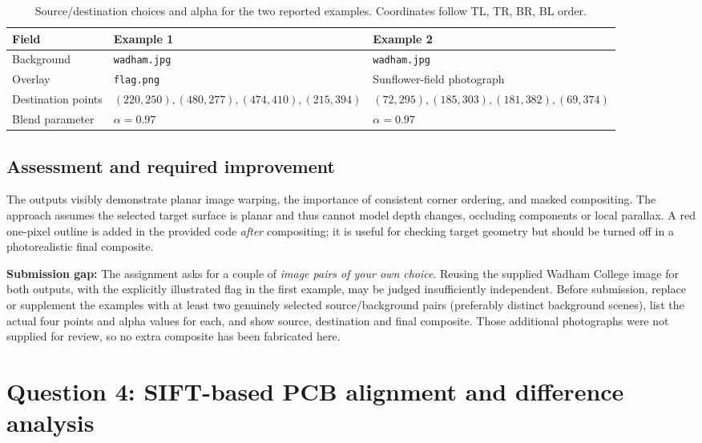 \documentclass[11pt,a4paper]{article}
\begin{document}
\begin{table}[H]\centering\small
\caption{Source/destination choices and alpha for the two reported examples. Coordinates follow TL, TR, BR, BL order.}
\begin{tabularx}{\linewidth}{@{}lXX@{}}\toprule
Field & Example 1 & Example 2\\\midrule
Background & \texttt{wadham.jpg} & \texttt{wadham.jpg}\\
Overlay & \texttt{flag.png} & Sunflower-field photograph\\
Destination points & $(220,250),(480,277),(474,410),(215,394)$ & $(72,295),(185,303),(181,382),(69,374)$\\
Blend parameter & $\alpha=0.97$ & $\alpha=0.97$\\
\bottomrule\end{tabularx}
\end{table}

\subsection{Assessment and required improvement}
The outputs visibly demonstrate planar image warping, the importance of consistent corner ordering, and masked compositing. The approach assumes the selected target surface is planar and thus cannot model depth changes, occluding components or local parallax. A red one-pixel outline is added in the provided code \emph{after} compositing; it is useful for checking target geometry but should be turned off in a photorealistic final composite.

\textbf{Submission gap:} The assignment asks for a couple of \emph{image pairs of your own choice}. Reusing the supplied Wadham College image for both outputs, with the explicitly illustrated flag in the first example, may be judged insufficiently independent. Before submission, replace or supplement the examples with at least two genuinely selected source/background pairs (preferably distinct background scenes), list the actual four points and alpha values for each, and show source, destination and final composite. Those additional photographs were not supplied for review, so no extra composite has been fabricated here.

\section{Question 4: SIFT-based PCB alignment and difference analysis}
\end{document}
